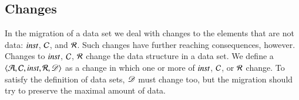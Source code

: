 \documentclass{elsarticle}
\begin{document}
%
%

\subsection{Changes}
   In the migration of a data set we deal with changes to the elements that are not data:
   $\mathbin{\text{\it inst\/}}$, $\mathcal{C}$, and $\mathcal{R}$.
   Such changes have further reaching consequences, however.
   Changes to $\mathbin{\text{\it inst\/}}$, $\mathcal{C}$, $\mathcal{R}$ change the data structure in a data set.
   We define a  $\langle\mathcal{A},\mathcal{C},\mathbin{\text{\it inst\/}},\mathcal{R},\mathscr{D}\rangle$ as a change in which one or more of $\mathbin{\text{\it inst\/}}$, $\mathcal{C}$, or $\mathcal{R}$ change.
   To satisfy the definition of data sets, $\mathscr{D}$ must change too,
   but the migration should try to preserve the maximal amount of data.
\end{document}
